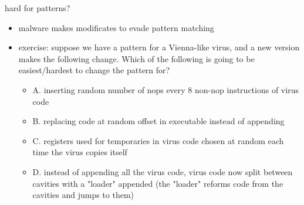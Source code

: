 

\begin{frame}{hard for patterns?}
    \begin{itemize}
    \item malware makes modificates to evade pattern matching
    \item exercise: suppose we have a pattern for a Vienna-like virus, and a new version makes the following
        change. Which of the following is going to be easiest/hardest to change the pattern for?
        \begin{itemize}
        \item A. inserting random number of nops every 8 non-nop instructions of virus code
        \item B. replacing code at random offset in executable instead of appending
        \item C. registers used for temporaries in virus code chosen at random each time the virus copies itself
        \item D. instead of appending all the virus code, virus code now split between cavities with a "loader" appended (the "loader" reforms code from the cavities and jumps to them)
        \end{itemize}
    \end{itemize}
\end{frame}
